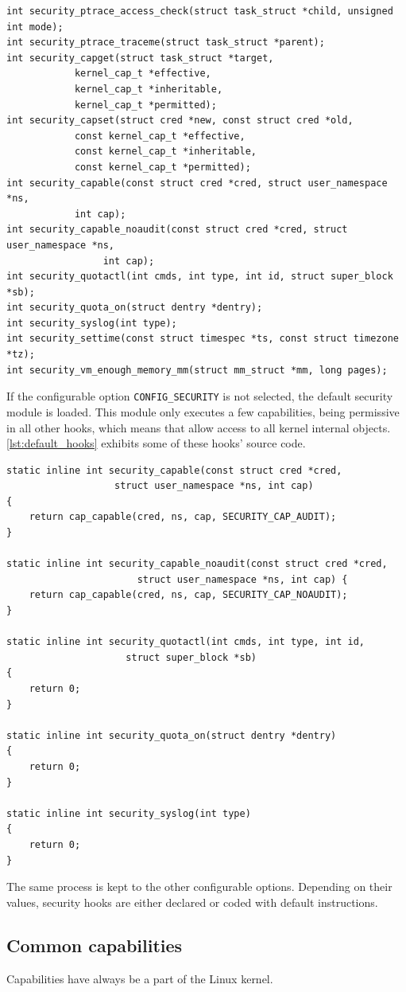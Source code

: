 \documentclass[]{article}
\begin{document}
\begin{lstlisting}[frame=none, numbers=none, caption=Security hooks declaration, label=lst:hooks]
int security_ptrace_access_check(struct task_struct *child, unsigned int mode);
int security_ptrace_traceme(struct task_struct *parent);
int security_capget(struct task_struct *target,
		    kernel_cap_t *effective,
		    kernel_cap_t *inheritable,
		    kernel_cap_t *permitted);
int security_capset(struct cred *new, const struct cred *old,
		    const kernel_cap_t *effective,
		    const kernel_cap_t *inheritable,
		    const kernel_cap_t *permitted);
int security_capable(const struct cred *cred, struct user_namespace *ns,
			int cap);
int security_capable_noaudit(const struct cred *cred, struct user_namespace *ns,
			     int cap);
int security_quotactl(int cmds, int type, int id, struct super_block *sb);
int security_quota_on(struct dentry *dentry);
int security_syslog(int type);
int security_settime(const struct timespec *ts, const struct timezone *tz);
int security_vm_enough_memory_mm(struct mm_struct *mm, long pages);
\end{lstlisting}

\noindent
If the configurable option \texttt{CONFIG\_SECURITY} is not selected, the default security module is loaded. This module only executes a few capabilities, being permissive in all other hooks, which means that allow access to all kernel internal objects. \autoref{lst:default_hooks} exhibits some of these hooks' source code.

\begin{lstlisting}[frame=none, numbers=none, caption=Default security hooks' source code, label=lst:default_hooks]
static inline int security_capable(const struct cred *cred,
				   struct user_namespace *ns, int cap)
{
	return cap_capable(cred, ns, cap, SECURITY_CAP_AUDIT);
}

static inline int security_capable_noaudit(const struct cred *cred,
					   struct user_namespace *ns, int cap) {
	return cap_capable(cred, ns, cap, SECURITY_CAP_NOAUDIT);
}

static inline int security_quotactl(int cmds, int type, int id,
				     struct super_block *sb)
{
	return 0;
}

static inline int security_quota_on(struct dentry *dentry)
{
	return 0;
}

static inline int security_syslog(int type)
{
	return 0;
}
\end{lstlisting}

\noindent
The same process is kept to the other configurable options. Depending on their values, security hooks are either declared or coded with default instructions.

\subsection{Common capabilities}

Capabilities have always be a part of the Linux kernel. 

\renewcommand{\bibname}{References}


\end{document}
